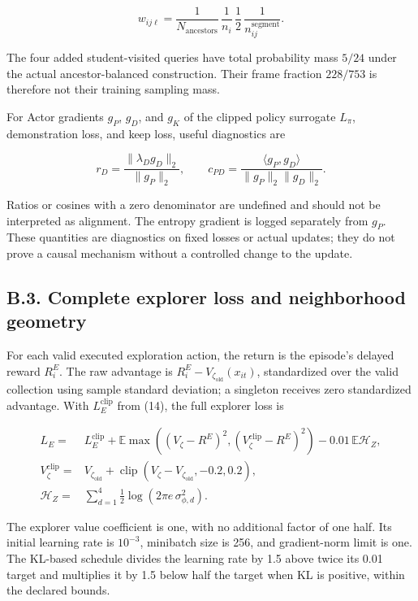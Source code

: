 \documentclass[
  american,
  11pt,
  a4paper,
]{article}
\begin{document}
\[
w_{ij\ell}=
\frac{1}{N_{\mathrm{ancestors}}}\,
\frac{1}{n_i}\,
\frac{1}{2}\,
\frac{1}{n_{ij}^{\mathrm{segment}}}.
\tag{57}\label{eq:57}
\]

The four added student-visited queries have total probability mass
\(5/24\) under the actual ancestor-balanced construction. Their frame
fraction \(228/753\) is therefore not their training sampling mass.

For Actor gradients \(g_P\), \(g_D\), and \(g_K\) of the clipped policy
surrogate \(L_\pi\), demonstration loss, and keep loss, useful
diagnostics are

\[
r_D=\frac{\|\lambda_Dg_D\|_2}{\|g_P\|_2},\qquad
c_{PD}=\frac{\langle g_P,g_D\rangle}
{\|g_P\|_2\|g_D\|_2}.
\tag{58}\label{eq:58}
\]

Ratios or cosines with a zero denominator are undefined and should not
be interpreted as alignment. The entropy gradient is logged separately
from \(g_P\). These quantities are diagnostics on fixed losses or actual
updates; they do not prove a causal mechanism without a controlled
change to the update.

\subsection{B.3. Complete explorer loss and neighborhood
geometry}\label{b.3.-complete-explorer-loss-and-neighborhood-geometry}

For each valid executed exploration action, the return is the episode's
delayed reward \(R_i^E\). The raw advantage is
\(R_i^E-V_{\zeta_{\mathrm{old}}}(x_{it})\), standardized over the valid
collection using sample standard deviation; a singleton receives zero
standardized advantage. With \(L_E^{\mathrm{clip}}\) from (14), the full
explorer loss is

\[
\begin{aligned}
L_E={}&L_E^{\mathrm{clip}}
+\mathbb E\max\!\left((V_\zeta-R^E)^2,(V_\zeta^{\mathrm{clip}}-R^E)^2\right)
-0.01\,\mathbb E\mathcal H_Z,\\
V_\zeta^{\mathrm{clip}}={}&V_{\zeta_{\mathrm{old}}}+
\operatorname{clip}(V_\zeta-V_{\zeta_{\mathrm{old}}},-0.2,0.2),\\
\mathcal H_Z={}&\sum_{d=1}^{4}\tfrac12\log(2\pi e\,\sigma_{\phi,d}^2).
\end{aligned}
\tag{59}\label{eq:59}
\]

The explorer value coefficient is one, with no additional factor of one
half. Its initial learning rate is \(10^{-3}\), minibatch size is 256,
and gradient-norm limit is one. The KL-based schedule divides the
learning rate by 1.5 above twice its 0.01 target and multiplies it by
1.5 below half the target when KL is positive, within the declared
bounds.
\end{document}
